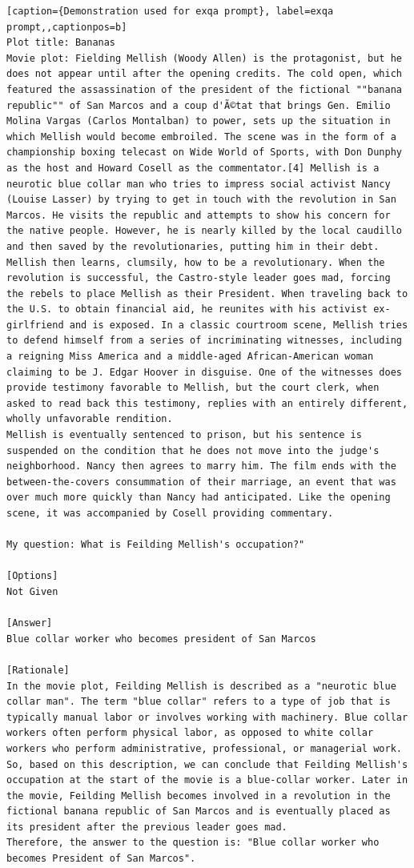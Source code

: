 \begin{lstlisting}[caption={Demonstration used for exqa prompt}, label=exqa prompt,,captionpos=b]
Plot title: Bananas
Movie plot: Fielding Mellish (Woody Allen) is the protagonist, but he does not appear until after the opening credits. The cold open, which featured the assassination of the president of the fictional ""banana republic"" of San Marcos and a coup d'Ã©tat that brings Gen. Emilio Molina Vargas (Carlos Montalban) to power, sets up the situation in which Mellish would become embroiled. The scene was in the form of a championship boxing telecast on Wide World of Sports, with Don Dunphy as the host and Howard Cosell as the commentator.[4] Mellish is a neurotic blue collar man who tries to impress social activist Nancy (Louise Lasser) by trying to get in touch with the revolution in San Marcos. He visits the republic and attempts to show his concern for the native people. However, he is nearly killed by the local caudillo and then saved by the revolutionaries, putting him in their debt. Mellish then learns, clumsily, how to be a revolutionary. When the revolution is successful, the Castro-style leader goes mad, forcing the rebels to place Mellish as their President. When traveling back to the U.S. to obtain financial aid, he reunites with his activist ex-girlfriend and is exposed. In a classic courtroom scene, Mellish tries to defend himself from a series of incriminating witnesses, including a reigning Miss America and a middle-aged African-American woman claiming to be J. Edgar Hoover in disguise. One of the witnesses does provide testimony favorable to Mellish, but the court clerk, when asked to read back this testimony, replies with an entirely different, wholly unfavorable rendition. 
Mellish is eventually sentenced to prison, but his sentence is suspended on the condition that he does not move into the judge's neighborhood. Nancy then agrees to marry him. The film ends with the between-the-covers consummation of their marriage, an event that was over much more quickly than Nancy had anticipated. Like the opening scene, it was accompanied by Cosell providing commentary.

My question: What is Feilding Mellish's occupation?"

[Options]
Not Given

[Answer]
Blue collar worker who becomes president of San Marcos

[Rationale]
In the movie plot, Feilding Mellish is described as a "neurotic blue collar man". The term "blue collar" refers to a type of job that is typically manual labor or involves working with machinery. Blue collar workers often perform physical labor, as opposed to white collar workers who perform administrative, professional, or managerial work. 
So, based on this description, we can conclude that Feilding Mellish's occupation at the start of the movie is a blue-collar worker. Later in the movie, Feilding Mellish becomes involved in a revolution in the fictional banana republic of San Marcos and is eventually placed as its president after the previous leader goes mad.
Therefore, the answer to the question is: "Blue collar worker who becomes President of San Marcos".




\end{lstlisting}
